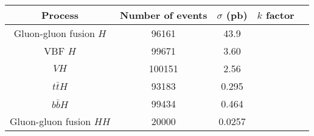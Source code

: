 \begin{tabular}{|c|c|c|c|c|}
\hline
Process & Number of events & $\sigma$ (pb) & $k$ factor \\
\hline
Gluon-gluon fusion $H$ & 96161 & 43.9 \\
VBF $H$ & 99671 & 3.60 \\
$VH$ & 100151 & 2.56 \\
$t\bar{t}H$ & 93183 & 0.295 \\
$b\bar{b}H$ & 99434 & 0.464 \\
Gluon-gluon fusion $HH$ & 20000 & 0.0257 \\
\hline
\end{tabular}
